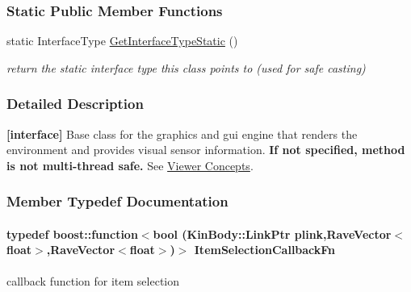 \subsubsection*{Static Public Member Functions}
\begin{DoxyCompactItemize}
\item 
\hypertarget{classOpenRAVE_1_1ViewerBase_affeafe65e7c4094f282d273dedbf069b}{
static InterfaceType \hyperlink{classOpenRAVE_1_1ViewerBase_affeafe65e7c4094f282d273dedbf069b}{GetInterfaceTypeStatic} ()}
\label{classOpenRAVE_1_1ViewerBase_affeafe65e7c4094f282d273dedbf069b}

\begin{DoxyCompactList}\small\item\em return the static interface type this class points to (used for safe casting) \item\end{DoxyCompactList}\end{DoxyCompactItemize}


\subsubsection{Detailed Description}
{\bfseries \mbox{[}interface\mbox{]}} Base class for the graphics and gui engine that renders the environment and provides visual sensor information. {\bfseries If not specified, method is not multi-\/thread safe.} See \hyperlink{arch__viewer}{Viewer Concepts}. 

\subsubsection{Member Typedef Documentation}
\hypertarget{classOpenRAVE_1_1ViewerBase_aab6d9553843a6d593ee530045d7fff9f}{
\paragraph[{ItemSelectionCallbackFn}]{\setlength{\rightskip}{0pt plus 5cm}typedef boost::function$<$bool (KinBody::LinkPtr plink,RaveVector$<$float$>$,RaveVector$<$float$>$)$>$ {\bf ItemSelectionCallbackFn}}\hfill}
\label{classOpenRAVE_1_1ViewerBase_aab6d9553843a6d593ee530045d7fff9f}


callback function for item selection 

